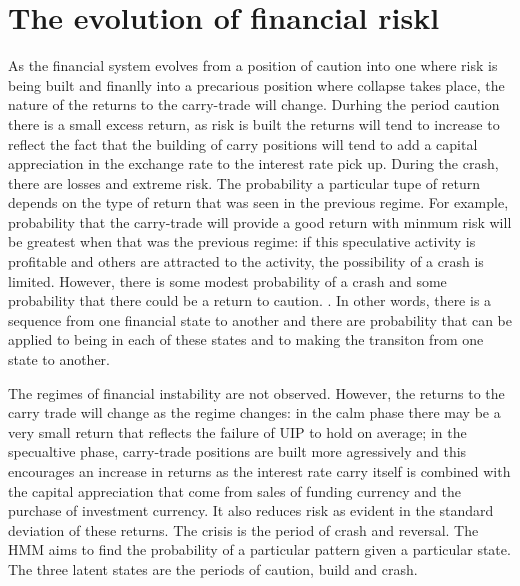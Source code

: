 \documentclass[12pt, a4paper, oneside]{article} %
\begin{document}
\section{The evolution of financial riskl}
As the financial system evolves from a position of caution into one where risk is being built and finanlly into a precarious position where collapse takes place, the nature of the returns to the carry-trade will change. Durhing the period caution there is a small excess return, as risk is built the returns will tend to increase to reflect the fact that the building of carry positions will tend to add a capital appreciation in the exchange rate to the interest rate pick up. During the crash, there are losses and extreme risk.   The probability a particular tupe of return depends on the type of return that was seen in the previous regime.   For example, probability that the carry-trade will provide a good return with minmum risk will be greatest when that was the previous regime:  if this speculative activity is profitable and others are attracted to the activity, the possibility of a crash is limited.  However, there is some modest probability of a crash and some probability that there could be a return to caution. .  In other words, there is a sequence from one financial state to another and there are probability that can be applied to being in each of these states and to making the transiton from one state to another.


The regimes of financial instability are not observed.  However, the returns to the carry trade will change as the regime changes:  in the calm phase there may be a very small return that reflects the failure of UIP to hold on average; in the specualtive phase, carry-trade positions are built more agressively and this encourages an increase in returns as the interest rate carry itself is combined with the capital appreciation that come from sales of funding currency and the purchase of investment currency.  It also reduces risk as evident in the standard deviation of these returns. The crisis is the period of crash and reversal.  The HMM aims to find the probability of a particular pattern given a particular state. The three latent states are the periods of caution, build and crash.   
\end{document}
